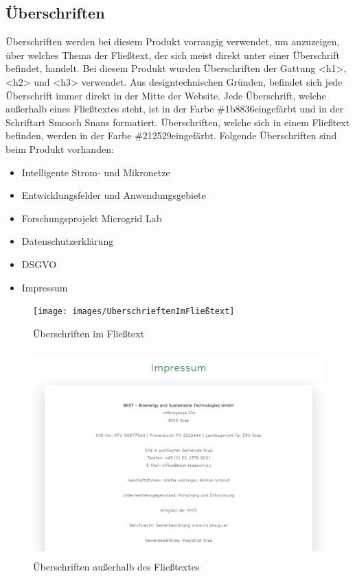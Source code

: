 \subsection{Überschriften}
Überschriften werden bei diesem Produkt vorrangig verwendet, um anzuzeigen, über welches Thema der Fließtext, der sich meist direkt unter einer Überschrift befindet, handelt. Bei diesem Produkt wurden Überschriften der Gattung <h1>, <h2> und <h3> verwendet. Aus designtechnischen Gründen, befindet sich jede Überschrift immer direkt in der Mitte der Website. Jede Überschrift, welche außerhalb eines Fließtextes steht, ist in der Farbe \glqq \#1b8836\grqq \space eingefärbt und in der Schriftart \glqq Smooch Snans \grqq \space formatiert. Überschriften, welche sich in einem Fließtext befinden, werden in der Farbe \glqq \#212529\grqq \space eingefärbt. Folgende Überschriften sind beim Produkt vorhanden: 
\begin{itemize}
	\item Intelligente Strom- und Mikronetze
	\item Entwicklungsfelder und Anwendungsgebiete
	\item Forschungsprojekt Microgrid Lab
	\item Datenschutzerklärung
	\item DSGVO
	\item Impressum
\end{itemize}
\newpage
\begin{figure}[h]
	\centering
	\texttt{[image: images/UberschrieftenImFließtext]}
	\caption{Überschriften im Fließtext}
	\label{fig: Überschriften im Fließtext}
\end{figure}
\begin{figure}[h]
	\centering
	\includegraphics[height=8cm,width=14cm]{images/ImpressumUberschrift}
	\caption{Überschriften außerhalb des Fließtextes}
	\label{fig: Überschriften außerhalb des Fließtextes}
\end{figure}
\newpage

